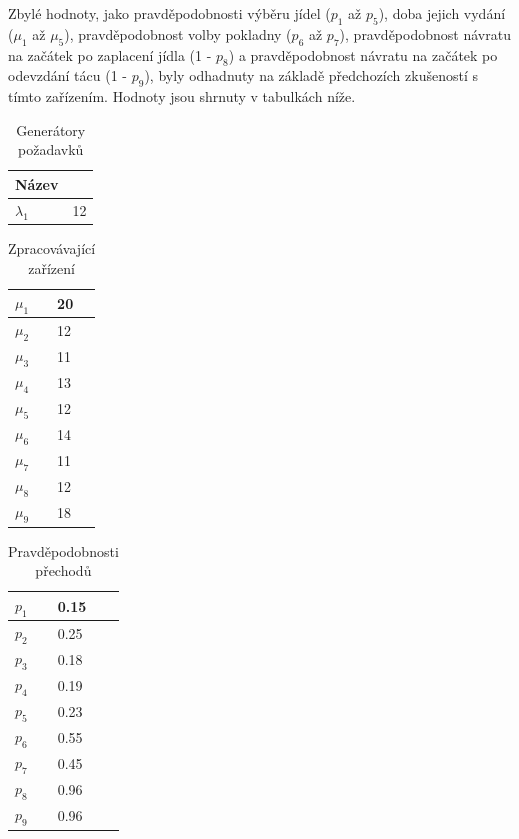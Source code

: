 \documentclass{article}
\begin{document}
Zbylé hodnoty, jako pravděpodobnosti výběru jídel ($p_1$ až $p_5$), doba jejich vydání ($\mu_1$ až  $\mu_5$), pravděpodobnost volby pokladny ($p_6$ až $p_7$), pravděpodobnost návratu na začátek po zaplacení jídla (1 - $p_8$) a pravděpodobnost návratu na začátek po odevzdání tácu  (1 - $p_9$), byly odhadnuty na základě předchozích zkušeností s tímto zařízením.
Hodnoty jsou shrnuty v tabulkách níže.

\begin{table} [ht!]
\centering
    \begin{tabular}{|l|l|}
    \hline
    Název & \\ \hline
    $\lambda_1$   & 12 \\ \hline
    \end{tabular}
\caption {Generátory požadavků}
\end{table}

\begin{table} [ht!]
\centering
    \begin{tabular}{|l|l|}
    \hline
   $\mu_1$     & 20 \\ \hline
    $\mu_2$  & 12 \\ \hline
    $\mu_3$     & 11 \\ \hline
    $\mu_4$     & 13 \\ \hline
    $\mu_5$     & 12 \\ \hline
    $\mu_6$      & 14 \\ \hline
    $\mu_7$      & 11 \\ \hline
    $\mu_8$      & 12 \\ \hline
    $\mu_9$      & 18 \\ \hline
    \end{tabular}
    \caption {Zpracovávající zařízení}
\end{table}

\begin{table} [ht!]
\centering
    \begin{tabular}{|l|l|}
    \hline
   $p_1$     & 0.15 \\ \hline
    $p_2$  & 0.25 \\ \hline
    $p_3$     & 0.18 \\ \hline
    $p_4$     & 0.19 \\ \hline
    $p_5$     & 0.23 \\ \hline
    $p_6$      & 0.55 \\ \hline
    $p_7$      & 0.45 \\ \hline
    $p_8$      & 0.96 \\ \hline
    $p_9$      & 0.96 \\ \hline
    \end{tabular}
    \caption {Pravděpodobnosti přechodů}
\end{table}
\end{document}
